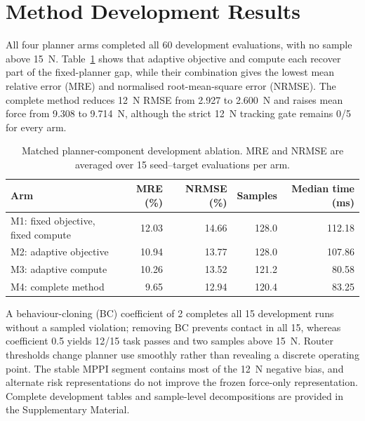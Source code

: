 \section{Method Development Results}
\label{sec:development_results}

All four planner arms completed all 60 development evaluations, with no
sample above 15~N. Table~\ref{tab:component_ablation_dev} shows that adaptive
objective and compute each recover part of the fixed-planner gap, while their
combination gives the lowest mean relative error (MRE) and normalised
root-mean-square error (NRMSE). The complete method reduces 12~N RMSE from
2.927 to 2.600~N and raises mean force from 9.308 to 9.714~N, although the
strict 12~N tracking gate remains 0/5 for every arm.

\begin{table}[t]
\centering
\caption{Matched planner-component development ablation. MRE and NRMSE are
averaged over 15 seed--target evaluations per arm.}
\label{tab:component_ablation_dev}
\small
\begin{tabular}{lrrrr}
\toprule
Arm & MRE (\%) & NRMSE (\%) & Samples & Median time (ms) \\
\midrule
M1: fixed objective, fixed compute & 12.03 & 14.66 & 128.0 & 112.18 \\
M2: adaptive objective             & 10.94 & 13.77 & 128.0 & 107.86 \\
M3: adaptive compute               & 10.26 & 13.52 & 121.2 &  80.58 \\
M4: complete method                &  9.65 & 12.94 & 120.4 &  83.25 \\
\bottomrule
\end{tabular}
\end{table}

A behaviour-cloning (BC) coefficient of 2 completes all 15 development runs
without a sampled violation; removing BC prevents contact in all 15, whereas
coefficient 0.5 yields 12/15 task passes and two samples above 15~N. Router
thresholds change planner use smoothly rather than revealing a discrete
operating point. The stable MPPI segment contains most of the 12~N negative
bias, and alternate risk representations do not improve the frozen
force-only representation. Complete development tables and sample-level
decompositions are provided in the Supplementary Material.

